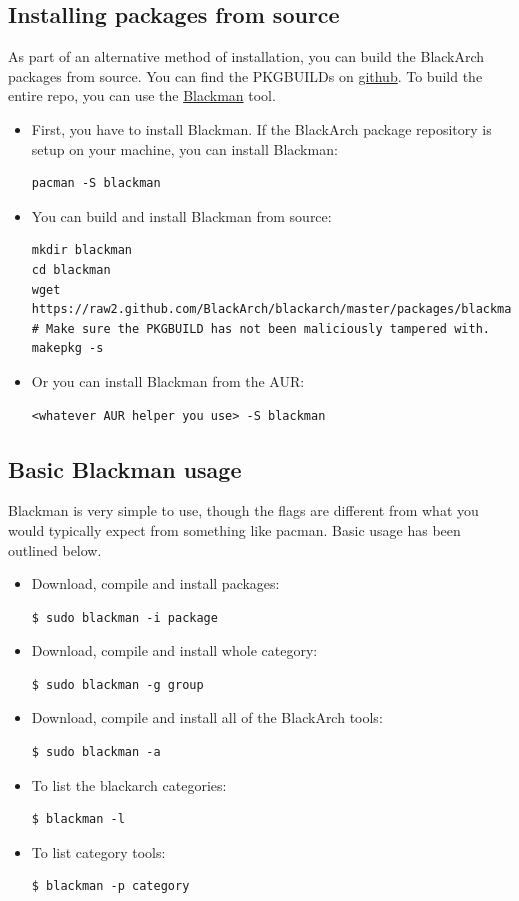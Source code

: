 \documentclass[a4paper, oneside, 11pt]{book}
\begin{document}
\subsection{Installing packages from source}
As part of an alternative method of installation, you can build the BlackArch
packages from source. You can find the PKGBUILDs on
\href{https://github.com/BlackArch/blackarch/tree/master/packages}{github}. To
build the entire repo, you can use the
\href{https://github.com/BlackArch/blackman}{Blackman} tool.
\begin{itemize}
\item First, you have to install Blackman. If the BlackArch package repository
is setup on your machine, you can install Blackman:
{\small
\begin{verbatim}
pacman -S blackman
\end{verbatim}
}
\item You can build and install Blackman from source:
{\small
\color{gray}
\begin{verbatim}
mkdir blackman
cd blackman
wget https://raw2.github.com/BlackArch/blackarch/master/packages/blackman/PKGBUILD
# Make sure the PKGBUILD has not been maliciously tampered with.
makepkg -s
\end{verbatim}
}
\item Or you can install Blackman from the AUR:
{\small
\color{gray}
\begin{verbatim}
<whatever AUR helper you use> -S blackman
\end{verbatim}
}
\end{itemize}

\subsection{Basic Blackman usage} Blackman is very simple to use, though the flags are different from what you
would typically expect from something like pacman. Basic usage has been outlined below.
\begin{itemize}
\item Download, compile and install packages:
{\small
\color{gray}
\begin{verbatim}
$ sudo blackman -i package
\end{verbatim}
}
\item Download, compile and install whole category:
{\small
\color{gray}
\begin{verbatim}
$ sudo blackman -g group
\end{verbatim}
}
\item Download, compile and install all of the BlackArch tools:
{\small
\color{gray}
\begin{verbatim}
$ sudo blackman -a
\end{verbatim}
}
\item To list the blackarch categories:
{\small
\color{gray}
\begin{verbatim}
$ blackman -l
\end{verbatim}
}
\item To list category tools:
{\small
\color{gray}
\begin{verbatim}
$ blackman -p category
\end{verbatim}
}
\end{itemize}
\end{document}
